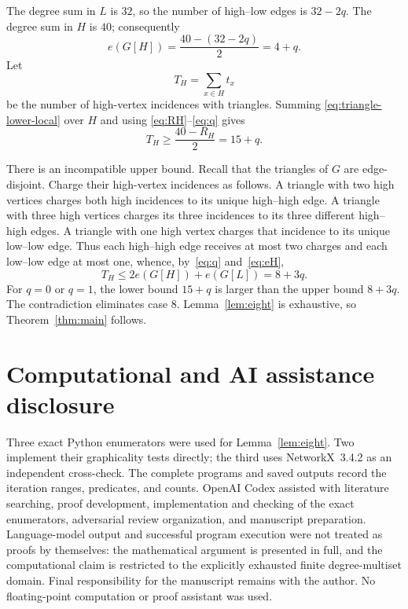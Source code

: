 \documentclass[11pt]{article}
\begin{document}
The degree sum in $L$ is $32$, so the number of high--low edges is
$32-2q$.  The degree sum in $H$ is $40$; consequently
\begin{equation}\label{eq:eH}
 e(G[H])=\frac{40-(32-2q)}2=4+q.
\end{equation}
Let
\[
 T_H=\sum_{x\in H}t_x
\]
be the number of high-vertex incidences with triangles.  Summing
\eqref{eq:triangle-lower-local} over $H$ and using
\eqref{eq:RH}--\eqref{eq:q} gives
\begin{equation}\label{eq:TH-lower}
 T_H\geq\frac{40-R_H}{2}=15+q.
\end{equation}

There is an incompatible upper bound.  Recall that the triangles of $G$
are edge-disjoint.  Charge their high-vertex incidences as follows.  A
triangle with two high vertices charges both high incidences to its unique
high--high edge.  A triangle with three high vertices charges its three
incidences to its three different high--high edges.  A triangle with one
high vertex charges that incidence to its unique low--low edge.  Thus each
high--high edge receives at most two charges and each low--low edge at most
one, whence, by~\eqref{eq:q} and~\eqref{eq:eH},
\begin{equation}\label{eq:TH-upper}
 T_H\leq2e(G[H])+e(G[L])=8+3q.
\end{equation}
For $q=0$ or $q=1$, the lower bound $15+q$ is larger than the upper bound
$8+3q$.  The contradiction eliminates case 8.  Lemma~\ref{lem:eight} is
exhaustive, so Theorem~\ref{thm:main} follows.

\section*{Computational and AI assistance disclosure}

Three exact Python enumerators were used for Lemma~\ref{lem:eight}.  Two
implement their graphicality tests directly; the third uses NetworkX~3.4.2
as an independent cross-check.  The complete programs and saved outputs
record the iteration ranges, predicates, and counts.  OpenAI Codex assisted
with literature searching, proof development, implementation and checking
of the exact enumerators, adversarial review organization, and manuscript
preparation.  Language-model output and successful program execution were
not treated as proofs by themselves: the mathematical argument is presented
in full, and the computational claim is restricted to the explicitly
exhausted finite degree-multiset domain.  Final responsibility for the
manuscript remains with the author.  No floating-point computation or proof
assistant was used.



\end{document}
